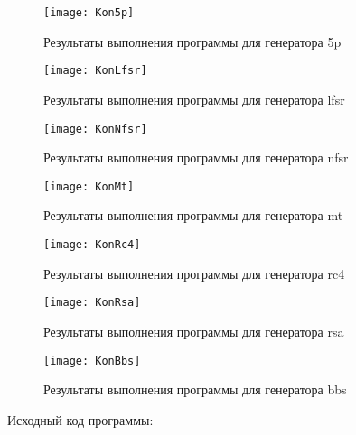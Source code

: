\documentclass[bachelor, och, coursework]{shiza}
\begin{document}
	\begin{figure}[H]
		\centering
		\texttt{[image: Kon5p]}
		\caption{Результаты выполнения программы для генератора 5p}
		\label{fig:Kon5p}
	\end{figure}	
	
	\begin{figure}[H]
		\centering
		\texttt{[image: KonLfsr]}
		\caption{Результаты выполнения программы для генератора lfsr}
		\label{fig:KonLfsr}
	\end{figure}
	
	\begin{figure}[H]
		\centering
		\texttt{[image: KonNfsr]}
		\caption{Результаты выполнения программы для генератора nfsr}
		\label{fig:KonNfsr}
	\end{figure}
	
	\begin{figure}[H]
		\centering
		\texttt{[image: KonMt]}
		\caption{Результаты выполнения программы для генератора mt}
		\label{fig:KonMt}
	\end{figure}		
	
	\begin{figure}[H]
		\centering
		\texttt{[image: KonRc4]}
		\caption{Результаты выполнения программы для генератора rc4}
		\label{fig:KonRc4}
	\end{figure}
	
	\begin{figure}[H]
		\centering
		\texttt{[image: KonRsa]}
		\caption{Результаты выполнения программы для генератора rsa}
		\label{fig:KonRsa}
	\end{figure}
	
	\begin{figure}[H]
		\centering
		\texttt{[image: KonBbs]}
		\caption{Результаты выполнения программы для генератора bbs}
		\label{fig:KonBbs}
	\end{figure}
	
	Исходный код программы:
	
\end{document}
